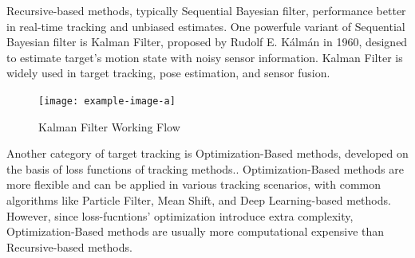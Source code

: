 Recursive-based methods, typically Sequential Bayesian filter, performance better in real-time tracking and unbiased estimates\cite{KumarMondal2021}. One powerfule variant of Sequential Bayesian filter is Kalman Filter, proposed by Rudolf E. Kálmán in 1960\cite{Kalman1960}, designed to estimate target's motion state with noisy sensor information. Kalman Filter is widely used in target tracking, pose estimation, and sensor fusion.
\begin{figure}[htb]
    \centering
    \texttt{[image: example-image-a]}
    \caption{Kalman Filter Working Flow}\label{F:test-a}
\end{figure}

Another category of target tracking is Optimization-Based methods, developed on the basis of loss functions of tracking methods.\cite{KumarMondal2021}. Optimization-Based methods are more flexible and can be applied in various tracking scenarios, with common algorithms like Particle Filter, Mean Shift, and Deep Learning-based methods. However, since loss-fucntions' optimization introduce extra complexity, Optimization-Based methods are usually more computational expensive than Recursive-based methods.

\nocite{Khabarlak_2022}



